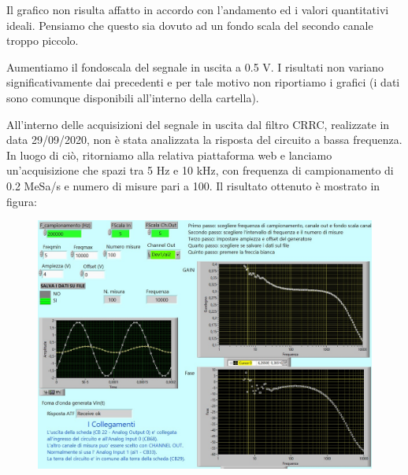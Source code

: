 Il grafico non risulta affatto in accordo con l'andamento ed i valori quantitativi ideali. Pensiamo che questo sia dovuto ad un fondo scala del secondo canale troppo piccolo.

Aumentiamo il fondoscala del segnale in uscita a 0.5 V. I risultati non variano significativamente dai precedenti e per tale motivo non riportiamo i grafici (i dati sono comunque disponibili all'interno della cartella).


All'interno delle acquisizioni del segnale in uscita dal filtro CRRC, realizzate in data 29/09/2020, non è stata analizzata la risposta del circuito a bassa frequenza. In luogo di ciò, ritorniamo alla relativa piattaforma web e lanciamo un'acquisizione che spazi tra 5 Hz e 10 kHz, con frequenza di campionamento di 0.2 MeSa/s e numero di misure pari a 100. Il risultato ottenuto è mostrato in figura:

\begin{figure}[H]
\caption{}
    \includegraphics[width=12cm]{settimana_2/immagini/CRRC_1_nuovo.jpg}
    \centering
\end{figure}


